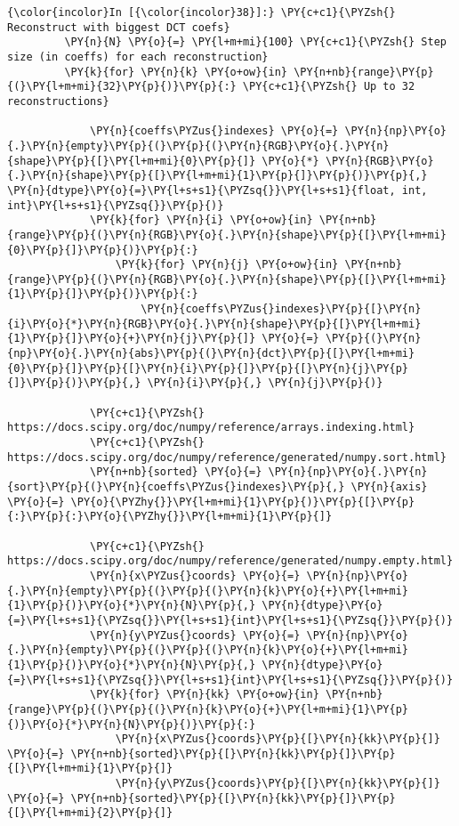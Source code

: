     \begin{Verbatim}[commandchars=\\\{\}]
{\color{incolor}In [{\color{incolor}38}]:} \PY{c+c1}{\PYZsh{} Reconstruct with biggest DCT coefs}
         \PY{n}{N} \PY{o}{=} \PY{l+m+mi}{100} \PY{c+c1}{\PYZsh{} Step size (in coeffs) for each reconstruction}
         \PY{k}{for} \PY{n}{k} \PY{o+ow}{in} \PY{n+nb}{range}\PY{p}{(}\PY{l+m+mi}{32}\PY{p}{)}\PY{p}{:} \PY{c+c1}{\PYZsh{} Up to 32 reconstructions}
             
             \PY{n}{coeffs\PYZus{}indexes} \PY{o}{=} \PY{n}{np}\PY{o}{.}\PY{n}{empty}\PY{p}{(}\PY{p}{(}\PY{n}{RGB}\PY{o}{.}\PY{n}{shape}\PY{p}{[}\PY{l+m+mi}{0}\PY{p}{]} \PY{o}{*} \PY{n}{RGB}\PY{o}{.}\PY{n}{shape}\PY{p}{[}\PY{l+m+mi}{1}\PY{p}{]}\PY{p}{)}\PY{p}{,} \PY{n}{dtype}\PY{o}{=}\PY{l+s+s1}{\PYZsq{}}\PY{l+s+s1}{float, int, int}\PY{l+s+s1}{\PYZsq{}}\PY{p}{)}
             \PY{k}{for} \PY{n}{i} \PY{o+ow}{in} \PY{n+nb}{range}\PY{p}{(}\PY{n}{RGB}\PY{o}{.}\PY{n}{shape}\PY{p}{[}\PY{l+m+mi}{0}\PY{p}{]}\PY{p}{)}\PY{p}{:}
                 \PY{k}{for} \PY{n}{j} \PY{o+ow}{in} \PY{n+nb}{range}\PY{p}{(}\PY{n}{RGB}\PY{o}{.}\PY{n}{shape}\PY{p}{[}\PY{l+m+mi}{1}\PY{p}{]}\PY{p}{)}\PY{p}{:}
                     \PY{n}{coeffs\PYZus{}indexes}\PY{p}{[}\PY{n}{i}\PY{o}{*}\PY{n}{RGB}\PY{o}{.}\PY{n}{shape}\PY{p}{[}\PY{l+m+mi}{1}\PY{p}{]}\PY{o}{+}\PY{n}{j}\PY{p}{]} \PY{o}{=} \PY{p}{(}\PY{n}{np}\PY{o}{.}\PY{n}{abs}\PY{p}{(}\PY{n}{dct}\PY{p}{[}\PY{l+m+mi}{0}\PY{p}{]}\PY{p}{[}\PY{n}{i}\PY{p}{]}\PY{p}{[}\PY{n}{j}\PY{p}{]}\PY{p}{)}\PY{p}{,} \PY{n}{i}\PY{p}{,} \PY{n}{j}\PY{p}{)}
             
             \PY{c+c1}{\PYZsh{} https://docs.scipy.org/doc/numpy/reference/arrays.indexing.html}
             \PY{c+c1}{\PYZsh{} https://docs.scipy.org/doc/numpy/reference/generated/numpy.sort.html}
             \PY{n+nb}{sorted} \PY{o}{=} \PY{n}{np}\PY{o}{.}\PY{n}{sort}\PY{p}{(}\PY{n}{coeffs\PYZus{}indexes}\PY{p}{,} \PY{n}{axis} \PY{o}{=} \PY{o}{\PYZhy{}}\PY{l+m+mi}{1}\PY{p}{)}\PY{p}{[}\PY{p}{:}\PY{p}{:}\PY{o}{\PYZhy{}}\PY{l+m+mi}{1}\PY{p}{]}
             
             \PY{c+c1}{\PYZsh{} https://docs.scipy.org/doc/numpy/reference/generated/numpy.empty.html}
             \PY{n}{x\PYZus{}coords} \PY{o}{=} \PY{n}{np}\PY{o}{.}\PY{n}{empty}\PY{p}{(}\PY{p}{(}\PY{n}{k}\PY{o}{+}\PY{l+m+mi}{1}\PY{p}{)}\PY{o}{*}\PY{n}{N}\PY{p}{,} \PY{n}{dtype}\PY{o}{=}\PY{l+s+s1}{\PYZsq{}}\PY{l+s+s1}{int}\PY{l+s+s1}{\PYZsq{}}\PY{p}{)}
             \PY{n}{y\PYZus{}coords} \PY{o}{=} \PY{n}{np}\PY{o}{.}\PY{n}{empty}\PY{p}{(}\PY{p}{(}\PY{n}{k}\PY{o}{+}\PY{l+m+mi}{1}\PY{p}{)}\PY{o}{*}\PY{n}{N}\PY{p}{,} \PY{n}{dtype}\PY{o}{=}\PY{l+s+s1}{\PYZsq{}}\PY{l+s+s1}{int}\PY{l+s+s1}{\PYZsq{}}\PY{p}{)}
             \PY{k}{for} \PY{n}{kk} \PY{o+ow}{in} \PY{n+nb}{range}\PY{p}{(}\PY{p}{(}\PY{n}{k}\PY{o}{+}\PY{l+m+mi}{1}\PY{p}{)}\PY{o}{*}\PY{n}{N}\PY{p}{)}\PY{p}{:}
                 \PY{n}{x\PYZus{}coords}\PY{p}{[}\PY{n}{kk}\PY{p}{]} \PY{o}{=} \PY{n+nb}{sorted}\PY{p}{[}\PY{n}{kk}\PY{p}{]}\PY{p}{[}\PY{l+m+mi}{1}\PY{p}{]}
                 \PY{n}{y\PYZus{}coords}\PY{p}{[}\PY{n}{kk}\PY{p}{]} \PY{o}{=} \PY{n+nb}{sorted}\PY{p}{[}\PY{n}{kk}\PY{p}{]}\PY{p}{[}\PY{l+m+mi}{2}\PY{p}{]}
         

\end{Verbatim}
